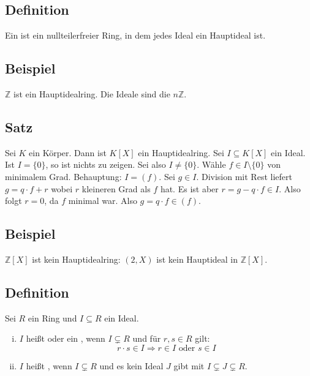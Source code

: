 \subsection[Definition: Hauptidealring]{Definition} %
\label{sub:67}
Ein  ist ein nullteilerfreier Ring, in dem jedes Ideal ein Hauptideal ist.

\subsection[Beispiel eines Hauptidealringes]{Beispiel} %
\label{sub:68}
$\mathds{Z}$ ist ein Hauptidealring. Die Ideale sind die $n \mathds{Z}$.

\subsection[Satz: Polynomringe über einen Körper sind Hauptidealringe]{Satz} %
\label{sub:69}
Sei $K$ ein Körper. Dann ist $K[X]$ ein Hauptidealring.
Sei $I \subseteq K[X]$ ein Ideal. Ist $I=\{0\}$, so ist nichts zu zeigen. Sei also $I \not= \{0\}$. Wähle $f \in I \setminus \{0\}$ von minimalem Grad. Behauptung: $I= (f)$.
Sei $g \in I$. Division mit Rest liefert $g = q \cdot f +r$ wobei $r$ kleineren Grad als $f$ hat. Es ist aber $r = g - q \cdot f \in I$. Also folgt $r=0$, da $f$ minimal war.
Also $g = q \cdot f \in (f)$. \bewende

\subsection[{Beispiel: $\mathds{Z}[X]$ ist kein Hauptidealring}]{Beispiel} %
\label{sub:610}
$\mathds{Z}[X]$ ist kein Hauptidealring: $(2,X)$ ist kein Hauptideal in $\mathds{Z}[X]$.

\subsection[Definition: Primideal und maximales Ideal]{Definition} %
\label{sub:611}
Sei $R$ ein Ring und $I \subseteq R$ ein Ideal.
\begin{enumerate}[(i)]
	\item $I$ heißt  oder ein , wenn  $I \subsetneq R$ und für $r,s \in R$ gilt:
	\[
		r \cdot s \in I \Longrightarrow r \in I \text{ oder } s \in I
	\]
	\item $I$ heißt , wenn $I \subsetneq R$ und es kein Ideal $J$ gibt mit $I \subsetneq J \subsetneq R$. 
\end{enumerate}

